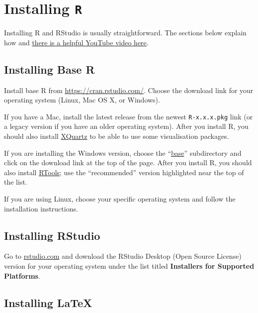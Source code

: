 \documentclass[
]{book}
\begin{document}
\hypertarget{appendix-appendices}{%
\appendix}


\hypertarget{installing-r}{%
\chapter{\texorpdfstring{Installing \texttt{R}}{Installing R}}\label{installing-r}}

Installing R and RStudio is usually straightforward. The sections below explain how and \href{https://www.youtube.com/watch?v=lVKMsaWju8w}{there is a helpful YouTube video here}.

\hypertarget{installing-base-r}{%
\section{Installing Base R}\label{installing-base-r}}

Install base R from \url{https://cran.rstudio.com/}. Choose the download link for your operating system (Linux, Mac OS X, or Windows).

If you have a Mac, install the latest release from the newest \texttt{R-x.x.x.pkg} link (or a legacy version if you have an older operating system). After you install R, you should also install \href{http://xquartz.macosforge.org/}{XQuartz} to be able to use some visualisation packages.

If you are installing the Windows version, choose the ``\href{https://cran.rstudio.com/bin/windows/base/}{base}'' subdirectory and click on the download link at the top of the page. After you install R, you should also install \href{https://cran.rstudio.com/bin/windows/Rtools/}{RTools}; use the ``recommended'' version highlighted near the top of the list.

If you are using Linux, choose your specific operating system and follow the installation instructions.

\hypertarget{installing-rstudio}{%
\section{Installing RStudio}\label{installing-rstudio}}

Go to \href{https://www.rstudio.com/products/rstudio/download/\#download}{rstudio.com} and download the RStudio Desktop (Open Source License) version for your operating system under the list titled \textbf{Installers for Supported Platforms}.

\hypertarget{installing-latex}{%
\section{Installing LaTeX}\label{installing-latex}}
\end{document}
